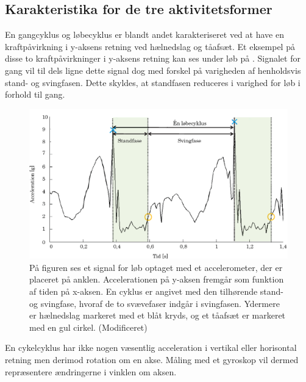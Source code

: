 \subsection{Karakteristika for de tre aktivitetsformer}
En gangcyklus og løbecyklus er blandt andet karakteriseret ved at have en kraftpåvirkning i y-aksens retning ved hælnedslag og tåafsæt. Et eksempel på disse to kraftpåvirkninger i y-aksens retning kan ses under løb på . Signalet for gang vil til dels ligne dette signal dog med forskel på varigheden af henholdsvis stand- og svingfasen. Dette skyldes, at standfasen reduceres i varighed for løb i forhold til gang.
\begin{figure}[H]
	\centering
	\includegraphics[scale=0.3]{figures/bProblemloesning/loeb_skolebog.png}
	\caption{På figuren ses et signal for løb optaget med et accelerometer, der er placeret på anklen. Accelerationen på y-aksen fremgår som funktion af tiden på x-aksen. En cyklus er angivet med den tilhørende stand- og svingfase, hvoraf de to svævefaser indgår i svingfasen. Ydermere er hælnedslag markeret med et blåt kryds, og et tåafsæt er markeret med en gul cirkel. \citep{Strohrmann2011} (Modificeret)}
	\label{fig:loeb_skolebog}
\end{figure}\vspace{-0.25cm}
En cykelcyklus har ikke nogen væsentlig acceleration i vertikal eller horisontal retning men derimod rotation om en akse. Måling med et gyroskop vil dermed repræsentere ændringerne i vinklen om aksen. \citep{Cockcroft2011,Marin-PerianuMarin-Perianu2013} 
